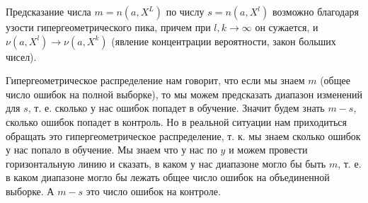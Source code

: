 Предсказание числа $m=n(a, X^L)$ по числу $s=n(a, X^l)$ возможно благодаря узости гипергеометрического пика, причем при $l,k \rightarrow \infty$ он сужается, и $\nu(a, X^l) \rightarrow \nu(a, X^k)$ (явление концентрации вероятности, закон больших чисел).

Гипергеометрическое распределение нам говорит, что если мы знаем $m$ (общее число ошибок на полной выборке), то мы можем предсказать диапазон изменений для $s$, т. е. сколько у нас ошибок попадет в обучение. Значит будем знать $m-s$, сколько ошибок попадет в контроль. Но в реальной ситуации нам приходиться обращать это гипергеометрическое распределение, т. к. мы знаем сколько ошибок у нас попало в обучение. Мы знаем что у нас по $y$ и можем провести горизонтальную линию и сказать, в каком у нас диапазоне могло бы быть $m$, т. е. в каком диапазоне могло бы лежать общее число ошибок на объединенной выборке. А $m-s$ это число ошибок на контроле.

